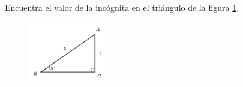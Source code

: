 \question[15]  Encuentra el valor de la incógnita en el triángulo de la figura \ref{fig:lados_functrig_03}.
\begin{figure}[H]
    \begin{center}
        \includegraphics[width=0.3\textwidth]{../images/lados_functrig_03.png}
    \end{center}
    \caption{}
    \label{fig:lados_functrig_03}
\end{figure}